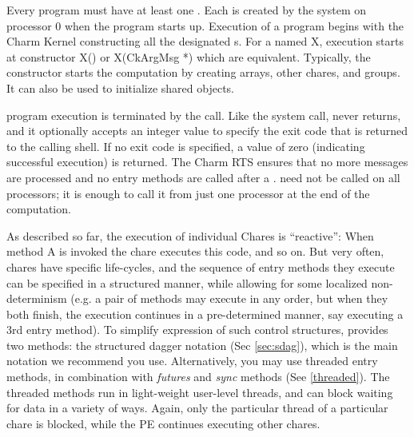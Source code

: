Every \charm program must have at least one .  Each
 is created by the system on processor 0 when the \charm
program starts up.  Execution of a \charm program begins with the
Charm Kernel constructing all the designated s.  For
a  named X, execution starts at constructor X() or
X(CkArgMsg *) which are equivalent.  Typically, the
 constructor starts the computation by creating arrays, other
chares, and groups.  It can also be used to initialize shared 
objects.

\charm program execution is terminated by the  call.  Like the
 system call,  never returns, and it optionally accepts
an integer value to specify the exit code that is returned to the
calling shell. If no exit code is specified, a value of zero (indicating
successful execution) is returned. The Charm RTS ensures
that no more messages are processed and no entry methods are called after a
.  need not be called on all processors; it is enough
to call it from just one processor at the end of the computation.


As described so far, the execution of individual Chares is
``reactive'': When method A is invoked the chare executes this code,
and so on. But very often, chares have specific life-cycles, and the
sequence of entry methods they execute can be specified in a
structured manner, while allowing for some localized non-determinism
(e.g. a pair of methods may execute in any order, but when they both
finish, the execution continues in a pre-determined manner, say
executing a 3rd entry method). To simplify expression of such control
structures, \charm provides two methods: the structured dagger
notation (Sec \ref{sec:sdag}), which is the main notation we recommend
you use.  Alternatively, you may use threaded entry methods, in
combination with {\em futures} and {\em sync} methods
(See \ref{threaded}). The threaded methods run in light-weight
user-level threads, and can block waiting for data in a variety of
ways. Again, only the particular thread of a particular chare is
blocked, while the PE continues executing other chares.


